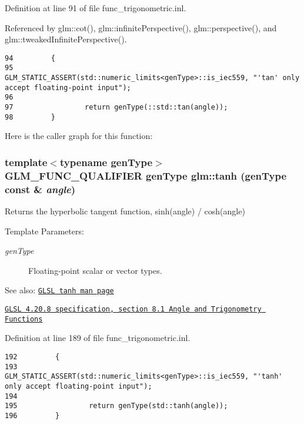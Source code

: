 Definition at line 91 of file func\_\-trigonometric.inl.

Referenced by glm::cot(), glm::infinitePerspective(), glm::perspective(), and glm::tweakedInfinitePerspective().

\begin{Code}\begin{verbatim}94         {
95                 GLM_STATIC_ASSERT(std::numeric_limits<genType>::is_iec559, "'tan' only accept floating-point input");
96 
97                 return genType(::std::tan(angle));
98         }
\end{verbatim}
\end{Code}




Here is the caller graph for this function:\hypertarget{group__core__func__trigonometric_gaa29bdd7f3b57755a7b6a9834d59887f}{
\subsubsection[tanh]{\setlength{\rightskip}{0pt plus 5cm}template$<$typename genType$>$ GLM\_\-FUNC\_\-QUALIFIER genType glm::tanh (genType const \& {\em angle})}}
\label{group__core__func__trigonometric_gaa29bdd7f3b57755a7b6a9834d59887f}


Returns the hyperbolic tangent function, sinh(angle) / cosh(angle)

\begin{Desc}
\item[Template Parameters:]
\begin{description}
\item[{\em genType}]Floating-point scalar or vector types.\end{description}
\end{Desc}
\begin{Desc}
\item[See also:]\href{http://www.opengl.org/sdk/docs/manglsl/xhtml/tanh.xml}{\tt GLSL tanh man page} 

\href{http://www.opengl.org/registry/doc/GLSLangSpec.4.20.8.pdf}{\tt GLSL 4.20.8 specification, section 8.1 Angle and Trigonometry Functions} \end{Desc}


Definition at line 189 of file func\_\-trigonometric.inl.

\begin{Code}\begin{verbatim}192         {
193                 GLM_STATIC_ASSERT(std::numeric_limits<genType>::is_iec559, "'tanh' only accept floating-point input");
194 
195                 return genType(std::tanh(angle));
196         }
\end{verbatim}
\end{Code}


